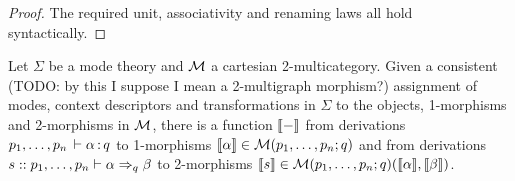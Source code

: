 \begin{proof}
The required unit, associativity and renaming laws all hold syntactically.

%
%
%
\end{proof}

\begin{theorem}
Let $\Sigma$ be a mode theory and $\mathcal{M}$ a cartesian 2-multicategory. Given a consistent (TODO: by this I suppose I mean a 2-multigraph morphism?) assignment of modes, context descriptors and transformations in $\Sigma$ to the objects, 1-morphisms and 2-morphisms in $\mathcal{M}$, there is a function $\llbracket -
\rrbracket$ from derivations $p_1, \dots, p_n \, \vdash \alpha \, \mathit{:} \, q$ to 1-morphisms $\llbracket \alpha \rrbracket \in \mathcal{M}(p_1, \dots, p_n; q)$ and from derivations $s ::p_1, \dots, p_n \vdash \alpha \Rightarrow_{q} \beta$ to 2-morphisms $\llbracket s \rrbracket \in \mathcal{M}(p_1, \dots, p_n; q)(\llbracket \alpha \rrbracket, \llbracket \beta \rrbracket)$.
\end{theorem}
